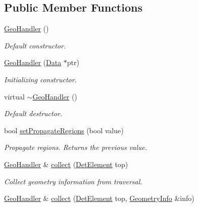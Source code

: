 \subsection*{Public Member Functions}
\begin{DoxyCompactItemize}
\item 
\hyperlink{class_d_d4hep_1_1_geometry_1_1_geo_handler_abbce30079f47cd87244d2d5ac2e301e4}{Geo\+Handler} ()
\begin{DoxyCompactList}\small\item\em Default constructor. \end{DoxyCompactList}\item 
\hyperlink{class_d_d4hep_1_1_geometry_1_1_geo_handler_a247d32d9a08a552eb6716c573c062eb1}{Geo\+Handler} (\hyperlink{class_d_d4hep_1_1_geometry_1_1_geo_handler_types_a568935b7e878d3ea9fe97a2ecf33d641}{Data} $\ast$ptr)
\begin{DoxyCompactList}\small\item\em Initializing constructor. \end{DoxyCompactList}\item 
virtual \hyperlink{class_d_d4hep_1_1_geometry_1_1_geo_handler_abb339356d911217c99b0869573d5284f}{$\sim$\+Geo\+Handler} ()
\begin{DoxyCompactList}\small\item\em Default destructor. \end{DoxyCompactList}\item 
bool \hyperlink{class_d_d4hep_1_1_geometry_1_1_geo_handler_aeaade3e58229faddb647861b301680e5}{set\+Propagate\+Regions} (bool value)
\begin{DoxyCompactList}\small\item\em Propagate regions. Returns the previous value. \end{DoxyCompactList}\item 
\hyperlink{class_d_d4hep_1_1_geometry_1_1_geo_handler}{Geo\+Handler} \& \hyperlink{class_d_d4hep_1_1_geometry_1_1_geo_handler_acdff622f718b2f71d40744f4665b80e9}{collect} (\hyperlink{class_d_d4hep_1_1_geometry_1_1_det_element}{Det\+Element} top)
\begin{DoxyCompactList}\small\item\em Collect geometry information from traversal. \end{DoxyCompactList}\item 
\hyperlink{class_d_d4hep_1_1_geometry_1_1_geo_handler}{Geo\+Handler} \& \hyperlink{class_d_d4hep_1_1_geometry_1_1_geo_handler_a807765ba56e60835ab300a906d008f07}{collect} (\hyperlink{class_d_d4hep_1_1_geometry_1_1_det_element}{Det\+Element} top, \hyperlink{class_d_d4hep_1_1_geometry_1_1_geo_handler_types_1_1_geometry_info}{Geometry\+Info} \&info)

\end{DoxyCompactItemize}
